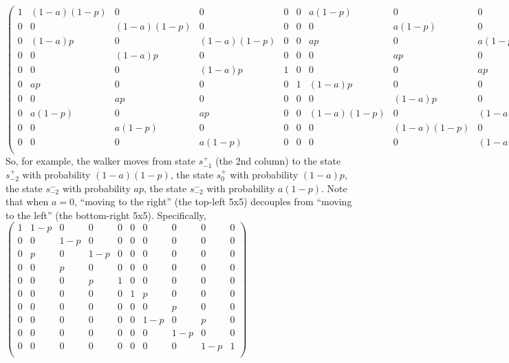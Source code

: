 \documentclass{article}
\begin{document}
$
\left(
\begin{array}{cccccccccc}
 1 & (1-a) (1-p) & 0 & 0 & 0 & 0 & a (1-p) & 0 & 0 & 0 \\
 0 & 0 & (1-a) (1-p) & 0 & 0 & 0 & 0 & a (1-p) & 0 & 0 \\
 0 & (1-a) p & 0 & (1-a) (1-p) & 0 & 0 & a p & 0 & a (1-p) & 0 \\
 0 & 0 & (1-a) p & 0 & 0 & 0 & 0 & a p & 0 & 0 \\
 0 & 0 & 0 & (1-a) p & 1 & 0 & 0 & 0 & a p & 0 \\
 0 & a p & 0 & 0 & 0 & 1 & (1-a) p & 0 & 0 & 0 \\
 0 & 0 & a p & 0 & 0 & 0 & 0 & (1-a) p & 0 & 0 \\
 0 & a (1-p) & 0 & a p & 0 & 0 & (1-a) (1-p) & 0 & (1-a) p & 0 \\
 0 & 0 & a (1-p) & 0 & 0 & 0 & 0 & (1-a) (1-p) & 0 & 0 \\
 0 & 0 & 0 & a (1-p) & 0 & 0 & 0 & 0 & (1-a) (1-p) & 1 \\
\end{array}
\right)
$ \\

So, for example, the walker moves from state $s^{+}_{-1}$ (the 2nd column) to 
the state $s^{+}_{-2}$ with probability $(1-a)(1-p)$,
the state $s^{+}_{0}$ with probability $(1-a) p$,
the state $s^{-}_{-2}$ with probability $a p$,
the state $s^{-}_{-2}$ with probability $a (1-p)$.
Note that when $a=0$, ``moving to the right'' (the top-left 5x5) decouples from ``moving to the left'' (the bottom-right 5x5). Specifically, \\

$
\left(
\begin{array}{cccccccccc}
 1 & 1-p & 0 & 0 & 0 & 0 & 0 & 0 & 0 & 0 \\
 0 & 0 & 1-p & 0 & 0 & 0 & 0 & 0 & 0 & 0 \\
 0 & p & 0 & 1-p & 0 & 0 & 0 & 0 & 0 & 0 \\
 0 & 0 & p & 0 & 0 & 0 & 0 & 0 & 0 & 0 \\
 0 & 0 & 0 & p & 1 & 0 & 0 & 0 & 0 & 0 \\
 0 & 0 & 0 & 0 & 0 & 1 & p & 0 & 0 & 0 \\
 0 & 0 & 0 & 0 & 0 & 0 & 0 & p & 0 & 0 \\
 0 & 0 & 0 & 0 & 0 & 0 & 1-p & 0 & p & 0 \\
 0 & 0 & 0 & 0 & 0 & 0 & 0 & 1-p & 0 & 0 \\
 0 & 0 & 0 & 0 & 0 & 0 & 0 & 0 & 1-p & 1 \\
\end{array}
\right)
$ \\
\end{document}

